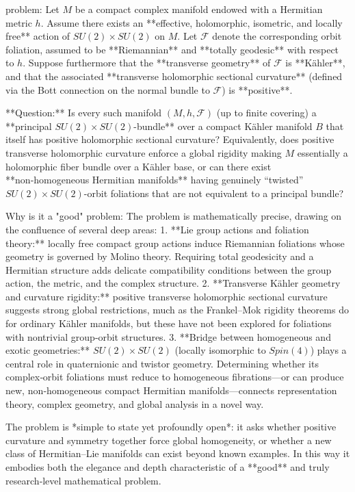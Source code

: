 problem:  
Let \(M\) be a compact complex manifold endowed with a Hermitian metric \(h\).  
Assume there exists an **effective, holomorphic, isometric, and locally free** action of \(SU(2)\times SU(2)\) on \(M\).  
Let \(\mathcal{F}\) denote the corresponding orbit foliation, assumed to be **Riemannian** and **totally geodesic** with respect to \(h\).  
Suppose furthermore that the **transverse geometry** of \(\mathcal{F}\) is **Kähler**, and that the associated **transverse holomorphic sectional curvature** (defined via the Bott connection on the normal bundle to \(\mathcal{F}\)) is **positive**.  

**Question:**  
Is every such manifold \((M, h, \mathcal{F})\) (up to finite covering) a **principal \(SU(2)\times SU(2)\)-bundle** over a compact Kähler manifold \(B\) that itself has positive holomorphic sectional curvature?  
Equivalently, does positive transverse holomorphic curvature enforce a global rigidity making \(M\) essentially a holomorphic fiber bundle over a Kähler base, or can there exist **non‑homogeneous Hermitian manifolds** having genuinely “twisted” \(SU(2)\times SU(2)\)-orbit foliations that are not equivalent to a principal bundle?  

Why is it a "good" problem:  
The problem is mathematically precise, drawing on the confluence of several deep areas:  
1. **Lie group actions and foliation theory:** locally free compact group actions induce Riemannian foliations whose geometry is governed by Molino theory. Requiring total geodesicity and a Hermitian structure adds delicate compatibility conditions between the group action, the metric, and the complex structure.  
2. **Transverse Kähler geometry and curvature rigidity:** positive transverse holomorphic sectional curvature suggests strong global restrictions, much as the Frankel–Mok rigidity theorems do for ordinary Kähler manifolds, but these have not been explored for foliations with nontrivial group‑orbit structures.  
3. **Bridge between homogeneous and exotic geometries:** \(SU(2)\times SU(2)\) (locally isomorphic to \(Spin(4)\)) plays a central role in quaternionic and twistor geometry. Determining whether its complex‑orbit foliations must reduce to homogeneous fibrations—or can produce new, non‑homogeneous compact Hermitian manifolds—connects representation theory, complex geometry, and global analysis in a novel way.  

The problem is *simple to state yet profoundly open*: it asks whether positive curvature and symmetry together force global homogeneity, or whether a new class of Hermitian–Lie manifolds can exist beyond known examples. In this way it embodies both the elegance and depth characteristic of a **good** and truly research‑level mathematical problem.
